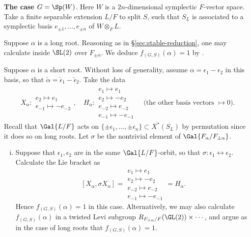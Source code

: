 \documentclass[a4paper,10pt]{article}
\begin{document}
\textbf{The case $G=\Sp(W)$}. Here $W$ is a $2n$-dimensional symplectic $F$-vector space. Take a finite separable extension $L/F$ to split $S$, such that $S_L$ is associated to a symplectic basis $e_{\pm 1}, \ldots, e_{\pm n}$ of $W \otimes_F L$.
\begin{asparaenum}
	\item Suppose $\alpha$ is a long root. Reasoning as in \S\ref{sec:stable-reduction}, one may calculate inside $\SL(2)$ over $F_{\pm\alpha}$. We deduce $f_{(G,S)}(\alpha) = 1$ by \cite[Lemma 7.3]{Kal15}.
	
	\item Suppose $\alpha$ is a short root. Without loss of generality, assume $\alpha = \epsilon_1 - \epsilon_2$ in this basis, so that $\check{\alpha} = \check{\epsilon}_1 - \check{\epsilon}_2$. Take the data
	\begin{gather*}
		X_\alpha: \begin{array}{l} e_2 \mapsto e_1 \\ e_{-1} \mapsto -e_{-2} \end{array}, \quad
		H_\alpha: \begin{array}{l}
		e_1 \mapsto e_1 \\
		e_2 \mapsto -e_2 \\
		e_{-2} \mapsto e_{-2} \\
		e_{-1} \mapsto -e_{-1}
	\end{array} \quad \text{(the other basis vectors $\mapsto 0$)}.	\end{gather*}
	Recall that $\Gal{L/F}$ acts on $\{\pm\epsilon_1, \ldots, \pm\epsilon_n\} \subset X^*(S_L)$ by permutation since it does so on long roots. Let $\sigma$ be the nontrivial element of $\Gal{F_\alpha/F_{\pm\alpha}}$.
	\begin{enumerate}[(i)]
		\item Suppose that $\epsilon_1, \epsilon_2$ are in the same $\Gal{L/F}$-orbit, so that $\sigma: \epsilon_1 \leftrightarrow \epsilon_2$. Calculate the Lie bracket as
		\[ [X_\alpha, \sigma X_\alpha] = \begin{array}{l}
		e_1 \mapsto e_1 \\
		e_2 \mapsto -e_2 \\
		e_{-2} \mapsto e_{-2} \\
		e_{-1} \mapsto -e_{-1}
		\end{array} = H_\alpha. \]
		Hence $f_{(G,S)}(\alpha) = 1$ in this case. Alternatively, we may also calculate $f_{(G,S)}(\alpha)$ in a twisted Levi subgroup $R_{F_{\pm\alpha}/F}(\GL(2)) \times \cdots$, and argue as in the case of long roots that $f_{(G,S)}(\alpha) = 1$.

\end{enumerate}
\end{asparaenum}
\end{document}
